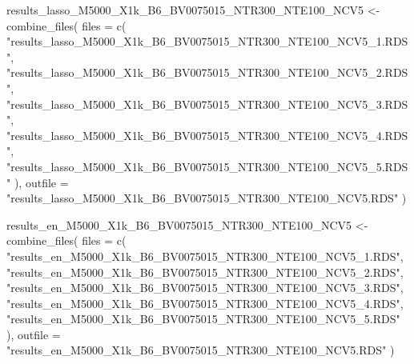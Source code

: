 \documentclass[
]{article}
\newenvironment{Shaded}{\begin{snugshade}}{\end{snugshade}}
\newcommand{\AttributeTok}[1]{\textcolor[rgb]{0.77,0.63,0.00}{#1}}
\newcommand{\FunctionTok}[1]{\textcolor[rgb]{0.00,0.00,0.00}{#1}}
\newcommand{\NormalTok}[1]{#1}
\newcommand{\OtherTok}[1]{\textcolor[rgb]{0.56,0.35,0.01}{#1}}
\newcommand{\StringTok}[1]{\textcolor[rgb]{0.31,0.60,0.02}{#1}}
\begin{document}
\begin{Shaded}
\begin{Highlighting}[]
\NormalTok{results\_lasso\_M5000\_X1k\_B6\_BV0075015\_NTR300\_NTE100\_NCV5 }\OtherTok{\textless{}{-}} \FunctionTok{combine\_files}\NormalTok{(}
  \AttributeTok{files =} \FunctionTok{c}\NormalTok{(}
    \StringTok{"results\_lasso\_M5000\_X1k\_B6\_BV0075015\_NTR300\_NTE100\_NCV5\_1.RDS"}\NormalTok{,}
    \StringTok{"results\_lasso\_M5000\_X1k\_B6\_BV0075015\_NTR300\_NTE100\_NCV5\_2.RDS"}\NormalTok{,}
    \StringTok{"results\_lasso\_M5000\_X1k\_B6\_BV0075015\_NTR300\_NTE100\_NCV5\_3.RDS"}\NormalTok{,}
    \StringTok{"results\_lasso\_M5000\_X1k\_B6\_BV0075015\_NTR300\_NTE100\_NCV5\_4.RDS"}\NormalTok{,}
    \StringTok{"results\_lasso\_M5000\_X1k\_B6\_BV0075015\_NTR300\_NTE100\_NCV5\_5.RDS"}
\NormalTok{  ),}
  \AttributeTok{outfile =} \StringTok{"results\_lasso\_M5000\_X1k\_B6\_BV0075015\_NTR300\_NTE100\_NCV5.RDS"}
\NormalTok{)}

\NormalTok{results\_en\_M5000\_X1k\_B6\_BV0075015\_NTR300\_NTE100\_NCV5 }\OtherTok{\textless{}{-}} \FunctionTok{combine\_files}\NormalTok{(}
  \AttributeTok{files =} \FunctionTok{c}\NormalTok{(}
    \StringTok{"results\_en\_M5000\_X1k\_B6\_BV0075015\_NTR300\_NTE100\_NCV5\_1.RDS"}\NormalTok{,}
    \StringTok{"results\_en\_M5000\_X1k\_B6\_BV0075015\_NTR300\_NTE100\_NCV5\_2.RDS"}\NormalTok{,}
    \StringTok{"results\_en\_M5000\_X1k\_B6\_BV0075015\_NTR300\_NTE100\_NCV5\_3.RDS"}\NormalTok{,}
    \StringTok{"results\_en\_M5000\_X1k\_B6\_BV0075015\_NTR300\_NTE100\_NCV5\_4.RDS"}\NormalTok{,}
    \StringTok{"results\_en\_M5000\_X1k\_B6\_BV0075015\_NTR300\_NTE100\_NCV5\_5.RDS"}
\NormalTok{  ),}
  \AttributeTok{outfile =} \StringTok{"results\_en\_M5000\_X1k\_B6\_BV0075015\_NTR300\_NTE100\_NCV5.RDS"}
\NormalTok{)}


\end{Highlighting}
\end{Shaded}
\end{document}
